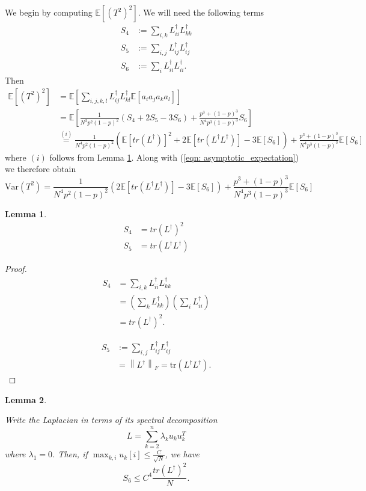 \documentclass{article}
\newcommand{\Expect}[1]{\mathbb{E}\left[ #1 \right]}
\newcommand{\Var}[1]{\mathrm{Var}\left( #1 \right)}
\newcommand{\norm}[1]{\left\lVert#1\right\rVert}
\newcommand{\Linv}{L^{\dagger}}
\newcommand{\tr}{\text{tr}}
\theoremstyle{alden}
\newtheorem{lemma}{Lemma}
\theoremstyle{definition}
\theoremstyle{remark}
\begin{document}
We begin by computing $\Expect{(T^2)^2}$. We will need the following terms
\begin{align*}
S_4 & := \sum_{i, k} \Linv_{ii} \Linv_{kk} \\
S_5 & := \sum_{i, j} \Linv_{ij} \Linv_{ij} \\
S_6 & := \sum_{i} \Linv_{ii} \Linv_{ii}.
\end{align*}
Then
\begin{align*}
\Expect{(T^2)^2} & = \Expect{\sum_{i,j,k,l} \Linv_{ij} \Linv_{kl} \Expect{a_i a_j a_k a_l} } \\
& = \Expect{\frac{1}{N^2 p^2(1 - p)^2}(S_4 + 2 S_5 - 3 S_6) + \frac{p^3 + (1 - p)^3}{N^4 p^3(1 - p)^3}S_6 } \\
& \overset{(i)}{=} \frac{1}{N^4 p^2(1 - p)^2} \left( \Expect{tr(\Linv)}^2 + 2 \Expect {tr(\Linv \Linv)} - 3 \Expect{S_6} \right) + \frac{p^3 + (1 - p)^3}{N^4 p^3(1 - p)^3} \Expect{S_6}
\end{align*}
where $(i)$ follows from Lemma \ref{lem: cross_moments}. Along with (\ref{eqn: asymptotic_expectation}) we therefore obtain
\begin{equation*}
\Var{T^2} = \frac{1}{N^4 p^2(1 - p)^2} \left( 2 \Expect {tr(\Linv \Linv)} - 3 \Expect{S_6} \right) + \frac{p^3 + (1 - p)^3}{N^4 p^3(1 - p)^3} \Expect{S_6}
\end{equation*} 

\begin{lemma}
	\label{lem: cross_moments}
	\begin{align*}
	S_4 & = tr(\Linv)^2 \\
	S_5 & = tr(\Linv \Linv)
	\end{align*}
\end{lemma}
\begin{proof}
	\begin{align*}
	S_4 & = \sum_{i, k} \Linv_{ii} \Linv_{kk} \\
	& = \left(\sum_{k} \Linv_{kk} \right)  \left(\sum_{i} \Linv_{ii} \right) \\
	& = tr(\Linv)^2.
	\end{align*}
	
	\begin{align*}
	S_5  & := \sum_{i, j} \Linv_{ij} \Linv_{ij} \\
	& = \norm{\Linv}_F = \tr(\Linv \Linv). 
	\end{align*}
\end{proof}

\begin{lemma}
	\label{lem: diagonal_elements}
	
	Write the Laplacian in terms of its spectral decomposition
	\begin{equation*}
	L = \sum_{k = 2}^{n} \lambda_k u_k u_k^T 
	\end{equation*}
	where $\lambda_1 = 0$. Then, if $\max_{k, i} u_k[i] \leq \frac{C}{\sqrt{N}}$,
	we have
	\begin{equation*}
	S_6 \leq C^4 \frac{tr(\Linv)^2}{N}.
	\end{equation*}
\end{lemma}
\end{document}
